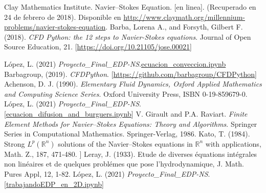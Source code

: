 \documentclass[A4,11pt]{article}
\begin{document}
\begin{thebibliography}{99}
 Clay Mathematics Institute. Navier–Stokes Equation. [en linea]. (Recuperado en 24 de febrero de 2018). Disponible en \href{http://www.claymath.org/millennium-problems/navier-stokes-equation.}{http://www.claymath.org/millennium-problems/navier-stokes-equation}.
	 Barba, Lorena A., and Forsyth, Gilbert F. (2018). \textit{CFD Python: the 12 steps to Navier-Stokes equations}. Journal of Open Source Education, 21. [\href{https://doi.org/10.21105/jose.00021}{https://doi.org/10.21105/jose.00021}]
	
		 López, L. (2021) \textit{Proyecto\_Final\_EDP-NS}.\href{https://github.com/LeonardoLopez2218061/Proyecto_Final_EDP-NS/blob/main/Desarrollo_Jupyter/ecuacion_conveccion.ipynb}{ecuacion\_conveccion.ipynb}
 Barbagroup, (2019). \textit{CFDPython}. [\href{https://github.com/barbagroup/CFDPython}{https://github.com/barbagroup/CFDPython}]
 Achenson, D. J. (1990). \textit{Elementary Fluid Dynamics, Oxford Applied Mathematics and Computing Science Series}. Oxford University Press, ISBN 0-19-859679-0.
	 López, L. (2021) \textit{Proyecto\_Final\_EDP-NS}. [\href{https://github.com/LeonardoLopez2218061/Proyecto_Final_EDP-NS/blob/main/Desarrollo_Jupyter/ecuacion_difusion_and_burguers.ipynb}{ecuacion\_difusion\_and\_burguers.ipynb}]
 V. Girault and P.A. Raviart. \textit{Finite Element Methods for Navier–Stokes Equations: Theory and Algorithms}. Springer Series in Computational Mathematics. Springer-Verlag, 1986.
 Kato, T. (1984). Strong $L^{p}(\mathbb{R}^n)$ solutions of the Navier–Stokes equations in $\mathbb{R}^n$ with applications, Math. Z., 187, 471-480.
 ] Leray, J. (1933). Etude de diverses équations intégrales non linéaires et de quelques problémes que pose l’hydrodynamique, J. Math. Pures Appl, 12, 1-82.
	 López, L. (2021) \textit{Proyecto\_Final\_EDP-NS}. [\href{https://github.com/LeonardoLopez2218061/Proyecto_Final_EDP-NS/blob/main/Desarrollo_Jupyter/trabajandoEDP_en_2D.ipynb}{trabajandoEDP\_en\_2D.ipynb}]

\end{thebibliography}
\end{document}
